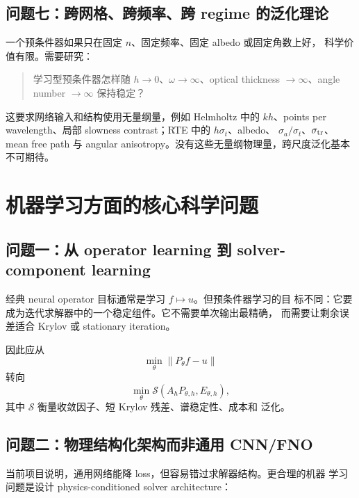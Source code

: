 \documentclass[UTF8,11pt,fontset=fandol]{ctexart}
\newcommand{\norm}[1]{\left\lVert #1 \right\rVert}
\begin{document}
\subsection{问题七：跨网格、跨频率、跨 regime 的泛化理论}

一个预条件器如果只在固定 \(n\)、固定频率、固定 albedo 或固定角数上好，
科学价值有限。需要研究：
\begin{quote}
  学习型预条件器怎样随 \(h\to0\)、\(\omega\to\infty\)、optical thickness
  \(\to\infty\)、angle number \(\to\infty\) 保持稳定？
\end{quote}

这要求网络输入和结构使用无量纲量，例如 Helmholtz 中的 \(kh\)、points
per wavelength、局部 slowness contrast；RTE 中的 \(h\sigma_t\)、albedo、
\(\sigma_a/\sigma_t\)、\(\sigma_{\rm tr}\)、mean free path 与 angular
anisotropy。没有这些无量纲物理量，跨尺度泛化基本不可期待。

\section{机器学习方面的核心科学问题}

\subsection{问题一：从 operator learning 到 solver-component learning}

经典 neural operator 目标通常是学习 \(f\mapsto u\)。但预条件器学习的目
标不同：它要成为迭代求解器中的一个稳定组件。它不需要单次输出最精确，
而需要让剩余误差适合 Krylov 或 stationary iteration。

因此应从
\[
  \min_\theta \norm{P_\theta f-u}
\]
转向
\[
  \min_\theta \mathcal{S}\left(A_hP_{\theta,h}, E_{\theta,h}\right),
\]
其中 \(\mathcal{S}\) 衡量收敛因子、短 Krylov 残差、谱稳定性、成本和
泛化。

\subsection{问题二：物理结构化架构而非通用 CNN/FNO}

当前项目说明，通用网络能降 loss，但容易错过求解器结构。更合理的机器
学习问题是设计 physics-conditioned solver architecture：
\end{document}
